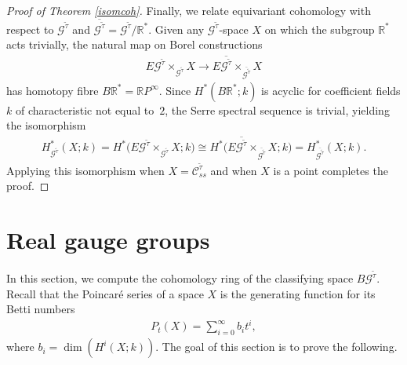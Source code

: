 \documentclass[10pt,a4paper]{amsart}
\numberwithin{equation}{section}
\begin{document}
\begin{proof}[Proof of Theorem \ref{isomcoh}]
Finally, we relate equivariant cohomology with respect to ${\mathcal G}^{\tilde{\tau}} $ and $\overline{{\mathcal G}^{\tilde{\tau}}} = {\mathcal G}^{\tilde{\tau}}/{\mathbb R}^*$. Given any ${\mathcal G}^{\tilde{\tau}}$-space $X$ on which the subgroup ${\mathbb R}^*$ acts trivially, the natural map on Borel constructions
\begin{gather*} E{\mathcal G}^{\tilde{\tau}} \times_{{\mathcal G}^{\tilde{\tau}}} X \rightarrow E\overline{{\mathcal G}^{\tilde{\tau}}} \times_{\overline{{\mathcal G}^{\tilde{\tau}}}} X \end{gather*}
has homotopy f\/ibre $B{\mathbb R}^* = {\mathbb R} P^{\infty}$. Since $H^*(B{\mathbb R}^*;k)$ is acyclic for coef\/f\/icient f\/ields $k$ of characteristic not equal to~$2$, the Serre spectral sequence is trivial, yielding the isomorphism
\begin{gather*}H^*_{{\mathcal G}^{\tilde{\tau}}}( X;k) = H^*\big( E{\mathcal G}^{\tilde{\tau}} \times_{{\mathcal G}^{\tilde{\tau}}} X; k\big) \cong H^*\big( E\overline{{\mathcal G}^{\tilde{\tau}}} \times_{\overline{{\mathcal G}^{\tilde{\tau}}}} X; k\big) = H^*_{\overline{{\mathcal G}^{\tilde{\tau}}}}( X;k) . \end{gather*}
Applying this isomorphism when $X = {\mathcal C}_{ss}^{\tilde{\tau}}$ and when $X$ is a point completes the proof.
\end{proof}

\section{Real gauge groups}\label{SScalcReal}

In this section, we compute the cohomology ring of the classifying space $B{\mathcal G}^{{\tilde{\tau}}}$. Recall that the Poincar\'e series of a space $X$ is the generating function for its Betti numbers \begin{gather*} P_t(X) = \sum_{i=0}^{\infty} b_it^i, \end{gather*}
where $b_i = \dim(H^i(X;k))$. The goal of this section is to prove the following.
\end{document}
